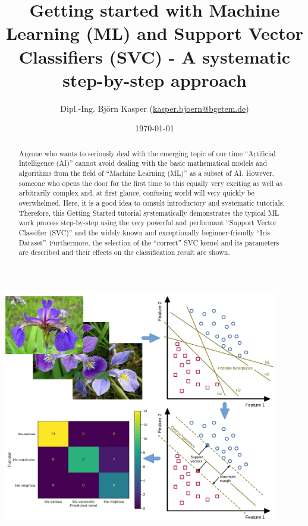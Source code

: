 \documentclass [oneside,10pt,a4paper,ngerman,BCOR10mm,headsepline,parindent,final]{scrartcl}
\title{\textbf{\textsf{Getting started with Machine Learning (ML) and Support Vector Classifiers (SVC) - A systematic step-by-step approach}}}\author{Dipl.-Ing. Bj\"orn Kasper (\href{mailto:kasper.bjoern@bgetem.de}{kasper.bjoern@bgetem.de})}\affil{Test and Certification Body for Electrical Engineering at BG ETEM}
\date{\today}
\begin{document}
    
    \pagestyle{empty}
    
    \maketitle\thispagestyle{empty}\begin{center}
        \includegraphics[width=0.90\textwidth]{images/Cover_image.pdf}
        \end{center}
        \vfill

    \begin{abstract}
    Anyone who wants to seriously deal with the emerging topic of our time ``Artificial Intelligence (AI)'' cannot avoid dealing with the basic mathematical models and algorithms from the field of ``Machine Learning (ML)'' as a subset of AI. However, someone who opens the door for the first time to this equally very exciting as well as arbitrarily complex and, at first glance, confusing world will very quickly be overwhelmed. Here, it is a good idea to consult introductory and systematic tutorials. Therefore, this Getting Started tutorial systematically demonstrates the typical ML work process step-by-step using the very powerful and performant ``Support Vector Classifier (SVC)'' and the widely known and exceptionally beginner-friendly ``Iris Dataset''. Furthermore, the selection of the ``correct'' SVC kernel and its parameters are described and their effects on the classification result are shown.
    \end{abstract}
    \vfill
    
\end{document}
